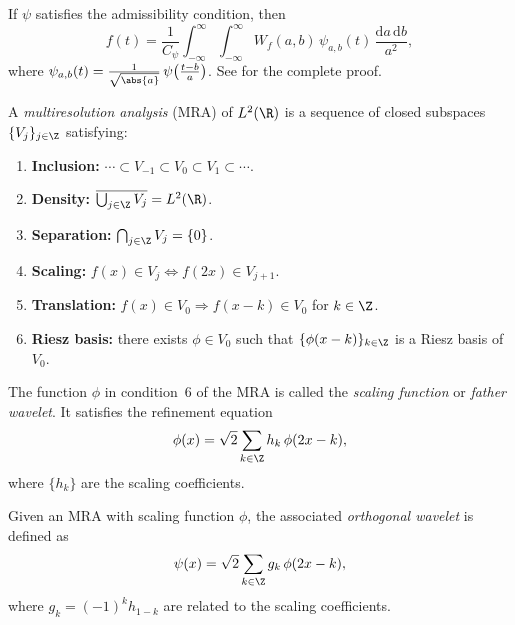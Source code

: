 \begin{theorem}
\label{thm:grids:wavelet-reconstruction}
If $\psi$ satisfies the admissibility condition, then
\[
  f(t) = \frac{1}{C_\psi} \int_{-\infty}^{\infty} \int_{-\infty}^{\infty}
    W_f(a, b)\, \psi_{a,b}(t)\, \frac{\mathrm{d}a\, \mathrm{d}b}{a^2},
\]
where $\psi_{a,b}(t) = \frac{1}{\sqrt{\abs{a}}}\, \psi\big(\frac{t-b}{a}\big)$.
See  for the complete proof.
\end{theorem}

\begin{definition}
\label{def:grids:mra}
A \emph{multiresolution analysis} (MRA) of $L^2(\R)$ is a sequence of closed
subspaces $\{V_j\}_{j \in \Z}$ satisfying:
\begin{enumerate}
  \item \textbf{Inclusion:} $\cdots \subset V_{-1} \subset V_0 \subset V_1 \subset \cdots$.
  \item \textbf{Density:} $\overline{\bigcup_{j \in \Z} V_j} = L^2(\R)$.
  \item \textbf{Separation:} $\bigcap_{j \in \Z} V_j = \{0\}$.
  \item \textbf{Scaling:} $f(x) \in V_j \Leftrightarrow f(2x) \in V_{j+1}$.
  \item \textbf{Translation:} $f(x) \in V_0 \Rightarrow f(x-k) \in V_0$ for $k \in \Z$.
  \item \textbf{Riesz basis:} there exists $\phi \in V_0$ such that
    $\{\phi(x-k)\}_{k \in \Z}$ is a Riesz basis of $V_0$.
\end{enumerate}
\end{definition}

\begin{definition}
\label{def:grids:scaling-function}
The function $\phi$ in condition~6 of the MRA is called the \emph{scaling
function} or \emph{father wavelet}. It satisfies the refinement equation
\[
  \phi(x) = \sqrt{2} \sum_{k \in \Z} h_k\, \phi(2x - k),
\]
where $\{h_k\}$ are the scaling coefficients.
\end{definition}

\begin{definition}
\label{def:grids:orthogonal-wavelet}
Given an MRA with scaling function $\phi$, the associated \emph{orthogonal
wavelet} is defined as
\[
  \psi(x) = \sqrt{2} \sum_{k \in \Z} g_k\, \phi(2x - k),
\]
where $g_k = (-1)^k h_{1-k}$ are related to the scaling coefficients.
\end{definition}


